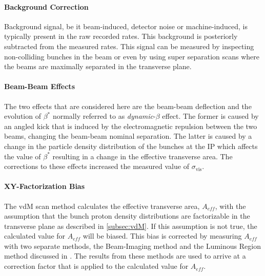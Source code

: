 
\paragraph{Background Correction}

Background signal, be it beam-induced, detector noise or machine-induced, is typically present in the raw recorded rates. This background is posteriorly subtracted from the measured rates. This signal can be measured by inspecting non-colliding bunches in the beam or even by using super separation scans where the beams are maximally separated in the transverse plane.

\paragraph{Beam-Beam Effects}

The two effects that are considered here are the beam-beam deflection and the evolution of $\beta^*$ normally referred to as \textit{dynamic}-$\beta$ effect. The former is caused by an angled kick that is induced by the electromagnetic repulsion between the two beams, changing the beam-beam nominal separation. The latter is caused by a change in the particle density distribution of the bunches at the IP which affects the value of $\beta^*$ resulting in a change in the effective transverse area. The corrections to these effects increased the measured value of $\sigma_{\mathrm{vis}}$.

\paragraph{XY-Factorization Bias}

The vdM scan method calculates the effective transverse area, $A_{eff}$, with the assumption that the bunch proton density distributions are factorizable in the transverse plane as described in \autoref{subsec:vdM}. If this assumption is not true, the calculated value for $A_{eff}$ will be biased. This bias is corrected by measuring $A_{eff}$ with two separate methods, the Beam-Imaging method \cite{Klute_2017} and the Luminous Region method discussed in \cite{Aaboud2016}. The results from these methods are used to arrive at a correction factor that is applied to the calculated value for $A_{eff}$.


